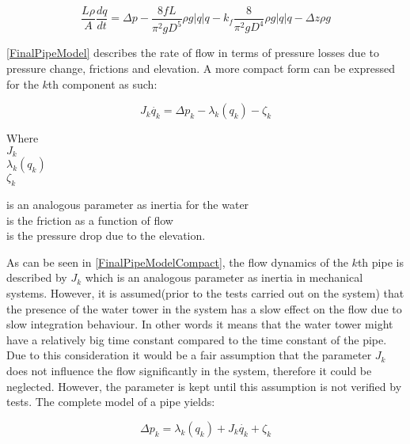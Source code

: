 \begin{equation}
\label{FinalPipeModel}
   \frac{L \rho}{A} \frac{dq}{dt} =\Delta p - \frac{8fL}{\pi^{2}gD^5} \rho g  |q| q - k_f \frac{8}{\pi^2gD^4} \rho g |q| q - \Delta z \rho g 
\end{equation}

\eqref{FinalPipeModel} describes the rate of flow in terms of pressure losses due to pressure change, frictions and elevation. A more compact form can be expressed for the $k$th component as such:

\begin{equation}
\label{FinalPipeModelCompact}
   J_k \dot{q_k} = \Delta p_k - \lambda_k(q_k) - \zeta_k 
\end{equation}

 \begin{minipage}[t]{0.20\textwidth}
Where\\
\hspace*{8mm} $J_k$ \\
\hspace*{8mm} $\lambda_k(q_k)$ \\
\hspace*{8mm} $\zeta_k$ 
\end{minipage}
\begin{minipage}[t]{0.68\textwidth}
\vspace*{2mm}
is an analogous parameter as inertia for the water\\ 
is the friction as a function of flow\\
is the pressure drop due to the elevation.
\end{minipage}

As can be seen in \eqref{FinalPipeModelCompact}, the flow dynamics of the $k$th pipe is described by $J_k$ which is an analogous parameter as inertia in mechanical systems. However, it is assumed(prior to the tests carried out on the system) that the presence of the water tower in the system has a slow effect on the flow due to slow integration behaviour. In other words it means that the water tower might have a relatively big time constant compared to the time constant of the pipe. Due to this consideration it would be a fair assumption that the parameter $J_k$ does not influence the flow significantly in the system, therefore it could be neglected. However, the parameter is kept until this assumption is not verified by tests. The complete model of a pipe yields: 
  
\begin{equation}
\label{FinalPipeModelSimplified}
  \Delta p_k  =   \lambda_k(q_k) + J_k \dot{q_k} + \zeta_k 
\end{equation}


